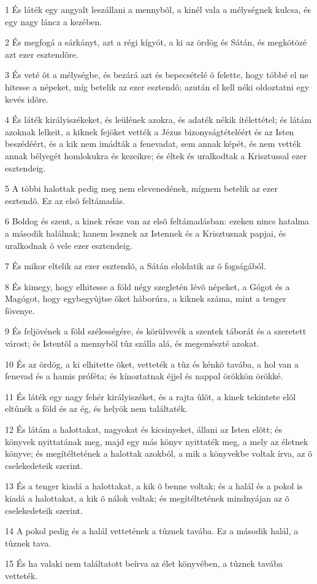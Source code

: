 \par 1 És láték egy angyalt leszállani a mennybõl, a kinél vala a mélységnek kulcsa, és egy nagy láncz a kezében.
\par 2 És megfogá a sárkányt, azt a régi kígyót, a ki az ördög és Sátán, és megkötözé azt ezer esztendõre.
\par 3 És veté õt a mélységbe, és bezárá azt és bepecsételé õ felette, hogy többé el ne hitesse a népeket, míg betelik az ezer esztendõ; azután el kell néki oldoztatni egy kevés idõre.
\par 4 És láték királyiszékeket, és leülének azokra, és adaték nékik ítélettétel; és látám azoknak lelkeit, a kiknek fejöket vették a Jézus bizonyságtételéért  és az Isten beszédéért, és a kik nem imádták a fenevadat, sem annak képét, és nem vették annak bélyegét homlokukra és kezeikre; és éltek és uralkodtak  a Krisztussal ezer esztendeig.
\par 5 A többi halottak pedig meg nem elevenedének, mígnem betelik az ezer esztendõ. Ez az elsõ feltámadás.
\par 6 Boldog és szent, a kinek része van az elsõ feltámadásban: ezeken nincs hatalma a második halálnak; hanem lesznek az Istennek és a  Krisztusnak papjai, és uralkodnak õ vele ezer esztendeig.
\par 7 És mikor eltelik az ezer esztendõ, a Sátán eloldatik az õ fogságából.
\par 8 És kimegy, hogy elhitesse a föld négy szegletén lévõ népeket, a Gógot és a Magógot, hogy egybegyûjtse  õket háborúra, a kiknek száma, mint a tenger fövenye.
\par 9 És feljövének a föld szélességére, és körülvevék a szentek táborát és a szeretett várost; és Istentõl a mennybõl tûz szálla alá, és megemészté azokat.
\par 10 És az ördög, a ki elhitette õket, vetteték a tûz és kénkõ tavába, a hol van a fenevad és a hamis próféta; és kínoztatnak éjjel és nappal örökkön örökké.
\par 11 És láték egy nagy fehér királyiszéket, és a rajta ûlõt, a kinek tekintete elõl eltûnék a föld és az ég, és helyök nem találtaték.
\par 12 És látám a halottakat, nagyokat és kicsinyeket, állani az Isten elõtt; és könyvek nyittatának meg, majd egy más könyv nyittaték meg, a mely  az életnek könyve; és megítéltetének a halottak azokból, a mik a könyvekbe voltak írva, az õ cselekedeteik szerint.
\par 13 És a tenger kiadá a halottakat, a kik õ benne voltak; és a halál és a pokol is kiadá a halottakat, a kik õ nálok voltak; és megítéltetének mindnyájan az õ cselekedeteik szerint.
\par 14 A pokol pedig és a halál vettetének a tûznek  tavába. Ez a második halál, a tûznek tava.
\par 15 És ha valaki nem találtatott beírva az élet könyvében, a tûznek tavába vetteték.

